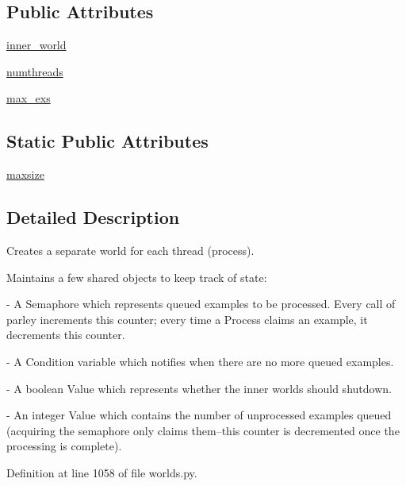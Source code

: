 \subsection*{Public Attributes}
\begin{DoxyCompactItemize}
\item 
\hyperlink{classparlai_1_1core_1_1worlds_1_1HogwildWorld_a4138f2e9cd59f349ac7b737256faf383}{inner\+\_\+world}
\item 
\hyperlink{classparlai_1_1core_1_1worlds_1_1HogwildWorld_adce46f602b3dbfb1b2aaaf2abfd502d6}{numthreads}
\item 
\hyperlink{classparlai_1_1core_1_1worlds_1_1HogwildWorld_a0224a6c9e173d699a7da6ebe1451f3a6}{max\+\_\+exs}
\end{DoxyCompactItemize}
\subsection*{Static Public Attributes}
\begin{DoxyCompactItemize}
\item 
\hyperlink{classparlai_1_1core_1_1worlds_1_1HogwildWorld_a5465066ad260dd6f8aeb648bb3088cd5}{maxsize}
\end{DoxyCompactItemize}


\subsection{Detailed Description}
\begin{DoxyVerb}Creates a separate world for each thread (process).

Maintains a few shared objects to keep track of state:

- A Semaphore which represents queued examples to be processed. Every call
  of parley increments this counter; every time a Process claims an
  example, it decrements this counter.

- A Condition variable which notifies when there are no more queued
  examples.

- A boolean Value which represents whether the inner worlds should shutdown.

- An integer Value which contains the number of unprocessed examples queued
  (acquiring the semaphore only claims them--this counter is decremented
  once the processing is complete).
\end{DoxyVerb}
 

Definition at line 1058 of file worlds.\+py.



